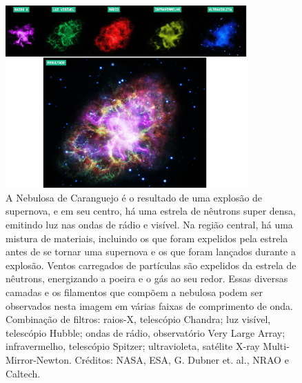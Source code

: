  \begin{figure}[h]
   \centering 
   \includegraphics[width=0.83\textwidth]{Imagens/caranguejo_02.png} 
   \caption[Combinação de filtros para imagem da Nebulosa de Caranguejo.]{A Nebulosa de Caranguejo é o resultado de uma explosão de supernova, e em seu centro, há uma estrela de nêutrons super densa, emitindo luz nas ondas de rádio e visível. Na região central, há uma mistura de materiais, incluindo os que foram expelidos pela estrela antes de se tornar uma supernova e os que foram lançados durante a explosão. Ventos carregados de partículas são expelidos da estrela de nêutrons, energizando a poeira e o gás ao seu redor. Essas diversas camadas e os filamentos que compõem a nebulosa podem ser observados nesta imagem em várias faixas de comprimento de onda. Combinação de filtros: raios-X, telescópio Chandra; luz visível, telescópio Hubble; ondas de rádio, observatório Very Large Array; infravermelho, telescópio Spitzer; ultravioleta, satélite X-ray Multi-Mirror-Newton. Créditos: NASA, ESA, G. Dubner et. al., NRAO e Caltech.}
   \label{fig:caranguejo} 
 \end{figure}
 
